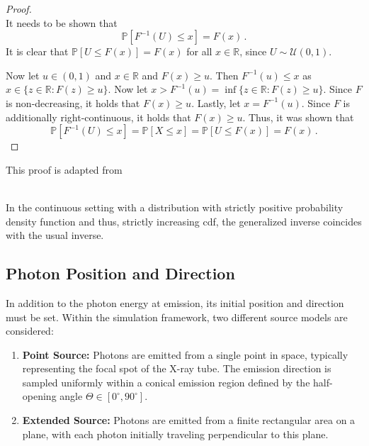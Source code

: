 \begin{proof}\ \\
It needs to be shown that
\begin{equation*}
    \mathbb{P}[F^{-1}(U) \leq x] = F(x)\,.
\end{equation*}
It is clear that $\mathbb{P}[U\leq F(x)] = F(x)$ for all $x \in \mathbb{R}$,
since $U \sim \mathcal{U}(0,1)$.

Now let $u\in(0,1)$ and $x\in\mathbb{R}$ and $F(x)\geq u$. Then $F^{-1}(u) \leq
x$ as $x\in\{z\in\mathbb{R}:F(z)\geq u\}$. Now let
$x>F^{-1}(u)=\inf\{z\in\mathbb{R}:F(z)\geq u\}$. Since $F$ is non-decreasing, it
holds that $F(x)\geq u$. Lastly, let $x=F^{-1}(u)$. Since $F$ is additionally
right-continuous, it holds that $F(x)\geq u$. Thus, it was shown that 
\begin{equation*}
    \mathbb{P}[F^{-1}(U)\leq x] = \mathbb{P}[X\leq x] = \mathbb{P}[U\leq F(x)] = F(x)\,.
\end{equation*}
\end{proof}

This proof is adapted from \cite{aneuki}

\begin{remark} \ \\
    In the continuous setting with a distribution with strictly positive
    probability density function and thus, strictly increasing \ac{cdf}, the
    generalized inverse coincides with the usual inverse.
\end{remark}


\subsection{Photon Position and Direction}
\label{sec:photon_position_direction}

In addition to the photon energy at emission, its initial position and direction
must be set. Within the simulation framework, two different source models are
considered:

\begin{enumerate}
    \item \textbf{Point Source:} Photons are emitted from a single point in
    space, typically representing the focal spot of the X-ray tube. The emission
    direction is sampled uniformly within a conical emission region defined by
    the half-opening angle $\Theta\in [0^\circ,90^\circ]$.
    \item \textbf{Extended Source:} Photons are emitted from a finite
    rectangular area on a plane, with each photon initially traveling
    perpendicular to this plane.
\end{enumerate}

